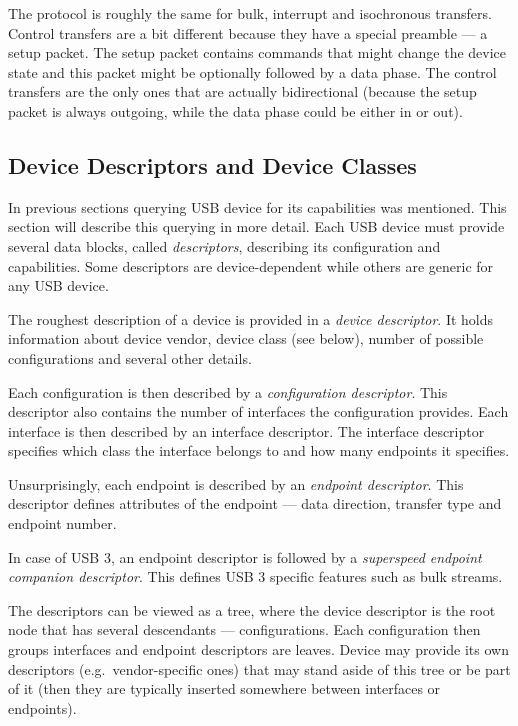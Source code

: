 The protocol is roughly the same for bulk, interrupt and isochronous
transfers. Control transfers are a bit different because they have a special
preamble — a setup packet. The setup packet contains commands that might
change the device state and this packet might be optionally followed by a data
phase. The control transfers are the only ones that are actually bidirectional
(because the setup packet is always outgoing, while the data phase could be
either in or out).

\subsection{Device Descriptors and Device Classes}

In previous sections querying USB device for its capabilities was mentioned.
This section will describe this querying in more detail. Each USB device must
provide several data blocks, called \textit{descriptors}, describing its
configuration and capabilities. Some descriptors are device-dependent while
others are generic for any USB device.

The roughest description of a device is provided in a \textit{device
descriptor}. It holds information about device vendor, device class (see
below), number of possible configurations and several other details.

Each configuration is then described by a \textit{configuration descriptor}.
This descriptor also contains the number of interfaces the configuration
provides. Each interface is then described by an interface descriptor. The
interface descriptor specifies which class the interface belongs to and how
many endpoints it specifies.

Unsurprisingly, each endpoint is described by an \textit{endpoint descriptor}.
This descriptor defines attributes of the endpoint — data direction, transfer
type and endpoint number.

In case of USB 3, an endpoint descriptor is followed by a \textit{superspeed
endpoint companion descriptor}. This defines USB 3 specific features such as
bulk streams.

The descriptors can be viewed as a tree, where the device descriptor is the
root node that has several descendants — configurations. Each configuration
then groups interfaces and endpoint descriptors are leaves. Device may provide
its own descriptors (e.g.\ vendor-specific ones) that may stand aside of this
tree or be part of it (then they are typically inserted somewhere between
interfaces or endpoints).

